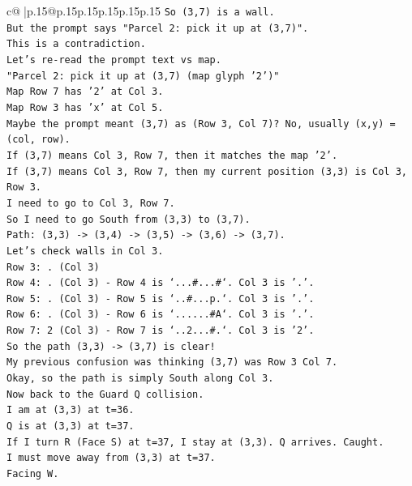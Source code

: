 \documentclass{article}
\begin{document}
{\begin{supertabular}{c@{$\;$}|p{.15\linewidth}@{}p{.15\linewidth}p{.15\linewidth}p{.15\linewidth}p{.15\linewidth}p{.15\linewidth}}
{{{\texttt{So (3,7) is a wall.} \\
\texttt{But the prompt says "Parcel 2: pick it up at (3,7)".} \\
\texttt{This is a contradiction.} \\
\texttt{Let's re{-}read the prompt text vs map.} \\
\texttt{"Parcel 2: pick it up at (3,7) (map glyph '2')"} \\
\texttt{Map Row 7 has '2' at Col 3.} \\
\texttt{Map Row 3 has 'x' at Col 5.} \\
\texttt{Maybe the prompt meant (3,7) as (Row 3, Col 7)? No, usually (x,y) = (col, row).} \\
\texttt{If (3,7) means Col 3, Row 7, then it matches the map '2'.} \\
\texttt{If (3,7) means Col 3, Row 7, then my current position (3,3) is Col 3, Row 3.} \\
\texttt{I need to go to Col 3, Row 7.} \\
\texttt{So I need to go South from (3,3) to (3,7).} \\
\texttt{Path: (3,3) {-}> (3,4) {-}> (3,5) {-}> (3,6) {-}> (3,7).} \\
\texttt{Let's check walls in Col 3.} \\
\texttt{Row 3: . (Col 3)} \\
\texttt{Row 4: . (Col 3) {-} Row 4 is `...\#...\#`. Col 3 is '.'.} \\
\texttt{Row 5: . (Col 3) {-} Row 5 is `..\#...p.`. Col 3 is '.'.} \\
\texttt{Row 6: . (Col 3) {-} Row 6 is `......\#A`. Col 3 is '.'.} \\
\texttt{Row 7: 2 (Col 3) {-} Row 7 is `..2...\#.`. Col 3 is '2'.} \\
\texttt{So the path (3,3) {-}> (3,7) is clear!} \\
\texttt{My previous confusion was thinking (3,7) was Row 3 Col 7.} \\
\texttt{Okay, so the path is simply South along Col 3.} \\
\texttt{Now back to the Guard Q collision.} \\
\texttt{I am at (3,3) at t=36.} \\
\texttt{Q is at (3,3) at t=37.} \\
\texttt{If I turn R (Face S) at t=37, I stay at (3,3). Q arrives. Caught.} \\
\texttt{I must move away from (3,3) at t=37.} \\
\texttt{Facing W.} \\
}}}
\end{supertabular}}
\end{document}
